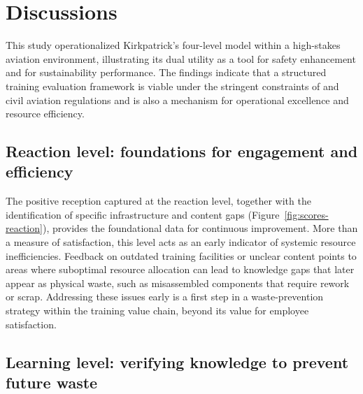 
\section{Discussions}
\label{sec:discussions}

This study operationalized Kirkpatrick's four-level model within a high-stakes aviation \MRO{} environment, illustrating its dual utility as a tool for safety enhancement and for sustainability performance. The findings indicate that a structured training evaluation framework is viable under the stringent constraints of \AS{} and civil aviation regulations and is also a mechanism for operational excellence and resource efficiency.

\subsection{Reaction level: foundations for engagement and efficiency}
\label{subsec:disc-reaction}

The positive reception captured at the reaction level, together with the identification of specific infrastructure and content gaps (Figure~\ref{fig:scores-reaction}), provides the foundational data for continuous improvement. More than a measure of satisfaction, this level acts as an early indicator of systemic resource inefficiencies. Feedback on outdated training facilities or unclear content points to areas where suboptimal resource allocation can lead to knowledge gaps that later appear as physical waste, such as misassembled components that require rework or scrap. Addressing these issues early is a first step in a waste-prevention strategy within the training value chain, beyond its value for employee satisfaction.

\subsection{Learning level: verifying knowledge to prevent future waste}
\label{subsec:disc-learning}


